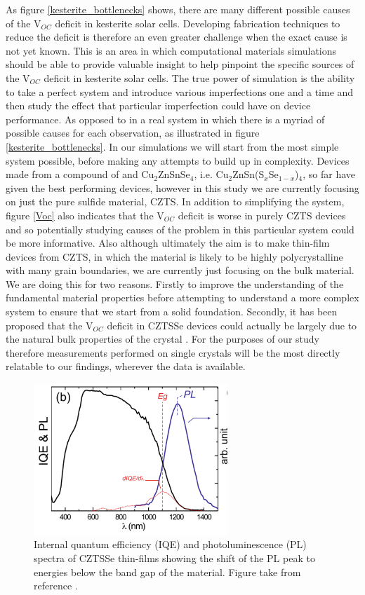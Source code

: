 As figure \ref{kesterite_bottlenecks} shows, there are many different possible causes of the  V$_{OC}$ deficit in kesterite solar cells. Developing fabrication techniques to reduce the deficit is therefore an even greater challenge when the exact cause is not yet known.
This is an area in which computational materials simulations should be able to provide valuable insight to help pinpoint the specific sources of the V$_{OC}$ deficit in kesterite solar cells. The true power of simulation is the ability to take a perfect system and introduce various imperfections one and a time and then study the effect that particular imperfection could have on device performance. As opposed to in a real system in which there is a myriad of possible causes for each observation, as illustrated in figure \ref{kesterite_bottlenecks}.
In our simulations we will start from the most simple system possible, before making any attempts to build up in complexity. Devices made from a compound of \CZTS  and Cu$_2$ZnSnSe$_4$, i.e. Cu$_2$ZnSn(S$_x$Se$_{1-x}$)$_4$, so far have given the best performing devices, however in this study we are currently focusing on just the pure sulfide material, CZTS. In addition to simplifying the system, figure \ref{Voc} also indicates that the V$_{OC}$ deficit is worse in purely CZTS devices and so potentially studying causes of the problem in this particular system could be more informative. Also although ultimately the aim is to make thin-film devices from CZTS, in which the material is likely to be highly polycrystalline with many grain boundaries, we are currently just focusing on the bulk material. We are doing this for two reasons. Firstly to improve the understanding of the fundamental material properties before attempting to understand a more complex system to ensure that we start from a solid foundation. Secondly, it has been proposed that the V$_{OC}$ deficit in CZTSSe devices could actually be largely due to the natural bulk properties of the crystal \cite{culprit_5}. For the purposes of our study therefore measurements performed on single crystals will be the most directly relatable to our findings, wherever the data is available.

\begin{figure}[h!]
  \centering
    \includegraphics[width=0.65\textwidth]{figures/CZTS_PL.png}
    \caption{Internal quantum efficiency (IQE) and photoluminescence (PL) spectra of CZTSSe thin-films showing the shift of the PL peak to energies below the band gap of the material. Figure take from reference .}
  \label{CZTS_PL}
\end{figure}

